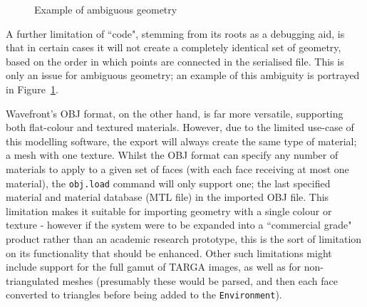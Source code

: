 \documentclass[a4paper,10pt]{article}
\begin{document}
\begin{itemize}
{\begin{figure}[t]
    \quad
    \caption{Example of ambiguous geometry}
    \label{geoambig}
\end{figure}

A further limitation of ``code", stemming from its roots as a debugging aid, is that in certain cases it will not create a completely identical set of geometry, based on the order in which points are connected in the serialised file. This is only an issue for ambiguous geometry; an example of this ambiguity is portrayed in Figure~\ref{geoambig}.

Wavefront's OBJ format, on the other hand, is far more versatile, supporting both flat-colour and textured materials. However, due to the limited use-case of this modelling software, the export will always create the same type of material; a mesh with one texture. Whilst the OBJ format can specify any number of materials to apply to a given set of faces (with each face receiving at most one material), the \texttt{obj.load} command will only support one; the last specified material and material database (MTL file) in the imported OBJ file. This limitation makes it suitable for importing geometry with a single colour or texture - however if the system were to be expanded into a ``commercial grade" product rather than an academic research prototype, this is the sort of limitation on its functionality that should be enhanced. Other such limitations might include support for the full gamut of TARGA images, as well as for non-triangulated meshes (presumably these would be parsed, and then each face converted to triangles before being added to the \texttt{Environment}).
 }
\end{itemize}
\end{document}
